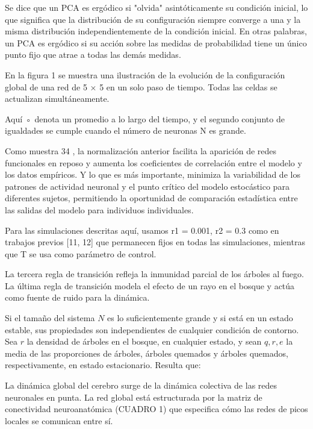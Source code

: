 
Se dice que un PCA es ergódico si "olvida" asintóticamente su condición inicial, lo que significa que la distribución de su configuración siempre converge a una y la misma distribución independientemente de la condición inicial. En otras palabras, un PCA es ergódico si su acción sobre las medidas de probabilidad tiene un único punto fijo que atrae a todas las demás medidas.

En la figura 1 se muestra una ilustración de la evolución de la configuración global de una red de 5 × 5 en un solo paso de tiempo. Todas las celdas se actualizan simultáneamente.


Aquí ◦ denota un promedio a lo largo del tiempo, y el segundo conjunto de igualdades se cumple cuando el número de neuronas N es grande.





Como muestra 34 , la normalización anterior facilita la aparición de redes funcionales en reposo y aumenta los coeficientes de correlación entre el modelo y los datos empíricos. Y lo que es más importante, minimiza la variabilidad de los patrones de actividad neuronal y el punto crítico del modelo estocástico para diferentes sujetos, permitiendo la oportunidad de comparación estadística entre las salidas del modelo para individuos individuales.



Para las simulaciones descritas aquí, usamos r1 = 0.001, r2 = 0.3 como en trabajos previos [11, 12] que permanecen fijos en todas las simulaciones, mientras que T se usa como parámetro de control.


La tercera regla de transición refleja la inmunidad parcial de los árboles al fuego. La última regla de transición modela el efecto de un rayo en el bosque y actúa como fuente de ruido para la dinámica.

Si el tamaño del sistema $N$ es lo suficientemente grande y si está en un estado estable, sus propiedades son independientes de cualquier condición de contorno. Sea $r$ la densidad de árboles en el bosque, en cualquier estado, y sean $q, r, e$ la media de las proporciones de árboles, árboles quemados y árboles quemados, respectivamente, en estado estacionario. Resulta que:

La dinámica global del cerebro surge de la dinámica colectiva de las redes neuronales en punta. La red global está estructurada por la matriz de conectividad neuroanatómica (CUADRO 1) que especifica cómo las redes de picos locales se comunican entre sí.



